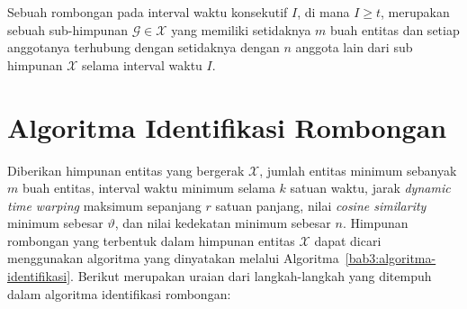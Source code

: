 Sebuah rombongan pada interval waktu konsekutif $I$, di mana $I \geq t$, merupakan sebuah sub-himpunan $\mathcal{G} \in \mathcal{X}$ yang memiliki setidaknya $m$ buah entitas dan setiap anggotanya terhubung dengan setidaknya dengan $n$ anggota lain dari sub himpunan $\mathcal{X}$ selama interval waktu $I$.

\section{Algoritma Identifikasi Rombongan}
\label{sec:algoritma}
    
Diberikan himpunan entitas yang bergerak $\mathcal{X}$, jumlah entitas minimum sebanyak $m$ buah entitas, interval waktu minimum selama $k$ satuan waktu, jarak \textit{dynamic time warping} maksimum sepanjang $r$ satuan panjang, nilai \textit{cosine similarity} minimum sebesar $\vartheta$, dan nilai kedekatan minimum sebesar $n$. Himpunan rombongan yang terbentuk dalam himpunan entitas $\mathcal{X}$ dapat dicari menggunakan algoritma yang dinyatakan melalui Algoritma~\ref{bab3:algoritma-identifikasi}. Berikut merupakan uraian dari langkah-langkah yang ditempuh dalam algoritma identifikasi rombongan:

